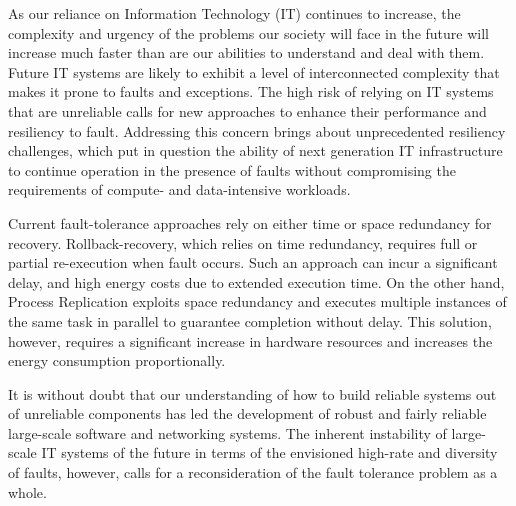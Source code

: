As our reliance on Information Technology (IT) continues to increase, the complexity and urgency of the problems our society will face in the future will increase much faster than are our abilities to understand and deal with them. Future IT systems are likely to exhibit a level of interconnected complexity that makes it prone to faults and exceptions. The high risk of relying on IT systems that are unreliable calls for new approaches to enhance their performance and resiliency to fault. Addressing this concern brings about unprecedented resiliency challenges, which put in question the ability of next generation IT infrastructure to continue operation in the presence of faults without compromising the requirements of compute- and data-intensive workloads. 

Current fault-tolerance approaches rely on either time or space redundancy for recovery. Rollback-recovery, which
relies on time redundancy, requires full or partial re-execution when fault occurs. 
Such an approach
can incur a significant delay, %
and high energy costs due to extended execution time.
On the other hand, Process Replication exploits space redundancy and executes multiple
instances of the same task in parallel to guarantee completion without delay.  %
This solution,
however, requires a significant increase in hardware resources and increases the energy consumption proportionally. 

It is without doubt that our understanding of how to build reliable systems out of unreliable components has led the development of robust and fairly reliable large-scale software and networking systems. The inherent instability of large-scale IT systems of the future in terms of the envisioned high-rate and diversity of faults, however, calls for a reconsideration of the fault tolerance problem as a whole. %


